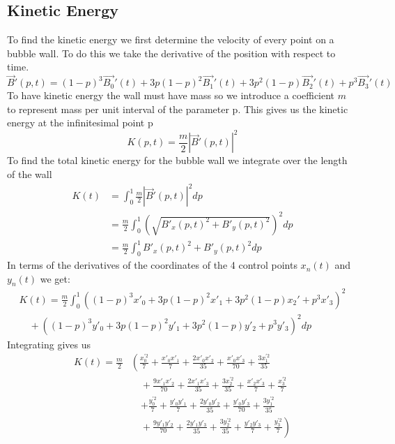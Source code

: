 \documentclass{article}
\begin{document}
\subsection{Kinetic Energy}
To find the kinetic energy we first determine the velocity of every point on a
bubble wall. To do this we take the derivative of the position with respect to
time.
\begin{displaymath}
\vec{B}'(p,t)=(1-p)^3\vec{B_0}'(t)+3p(1-p)^2\vec{B_1}'(t)+3p^2(1-p)\vec{B_2}'(t)+p^3\vec{B_3}'(t)
\end{displaymath}
To have kinetic energy the wall must have mass so we introduce a coefficient
$m$ to represent mass per unit interval of the parameter p. This gives us the kinetic energy at the
infinitesimal point p
\begin{displaymath}
K(p,t) = \frac{m}{2} \left|\vec{B}'(p,t)\right|^2
\end{displaymath}
To find the total kinetic energy for the bubble wall we integrate over the
length of the wall
\begin{align*}
K(t)&= \int_0^1 \frac{m}{2} \left|\vec{B}'(p,t)\right|^2 dp\\
&=\frac{m}{2} \int_0^1 \left(\sqrt{B'_x(p,t)^2+B'_y(p,t)^2}\right)^2 dp\\
&=\frac{m}{2} \int_0^1 B'_x(p,t)^2+B'_y(p,t)^2 dp
\end{align*}
In terms of the derivatives of the coordinates of the 4 control points $x_n(t)$
and $y_n(t)$ we get:
\begin{align*}
K(t)=\frac{m}{2} \int_0^1
\left((1-p)^3x'_0+3p(1-p)^2x'_1+3p^2(1-p)x_2'+p^3x'_3\right)^2 \\
 \quad+ \left((1-p)^3y'_0+3p(1-p)^2y'_1+3p^2(1-p)y'_2+p^3y'_3
\right)^2 dp
\end{align*}
Integrating gives us
\begin{align*}
K(t)=\frac{m}{2} &\left( 
\frac{x_0^{'2}}{7} + \frac{x'_0 x'_1}{7} + \frac{2 x'_0 x'_2}{35} + 
\frac{x'_0 x'_3}{70}  + \frac{3 x_1^{'2}}{35} \right.\\
&\left.\quad +\frac{9 x'_1 x'_2}{70} 
+ \frac{2 x'_1 x'_3}{35} + \frac{3 x_2^{'2}}{35} + \frac{x'_2 x'_3}{7} +\frac{x_3^{'2}}{7}\right.\\
&\quad\left. +\frac{y_0^{'2}}{7} + \frac{y'_0 y'_1}{7} + \frac{2 y'_0 y'_2}{35} + 
\frac{y'_0 y'_3}{70} + \frac{3 y_1^{'2}}{35} \right.\\
&\left.\quad  +\frac{9 y'_1 y'_2}{70} 
+ \frac{2 y'_1 y'_3}{35} + \frac{3 y_2^{'2}}{35} + \frac{y'_2 y'_3}{7}
+\frac{y_3^{'2}}{7}\right)
\end{align*}
\end{document}
